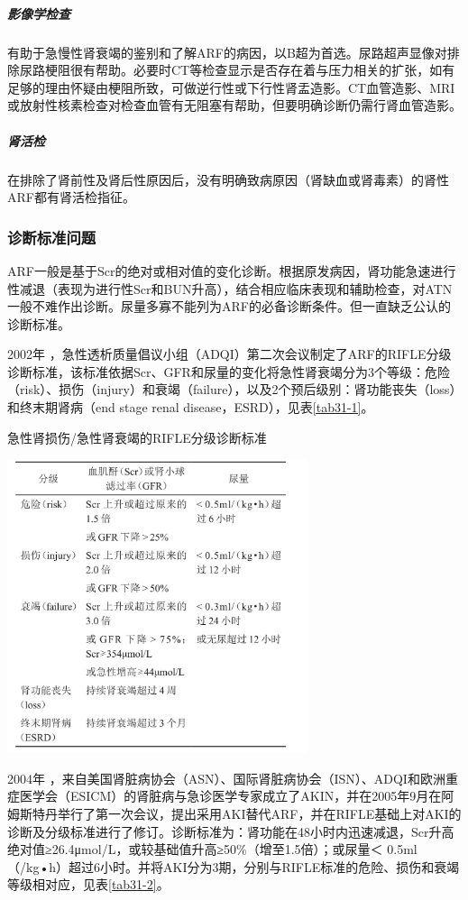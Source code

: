 \subparagraph{影像学检查}

有助于急慢性肾衰竭的鉴别和了解ARF的病因，以B超为首选。尿路超声显像对排除尿路梗阻很有帮助。必要时CT等检查显示是否存在着与压力相关的扩张，如有足够的理由怀疑由梗阻所致，可做逆行性或下行性肾盂造影。CT血管造影、MRI或放射性核素检查对检查血管有无阻塞有帮助，但要明确诊断仍需行肾血管造影。

\subparagraph{肾活检}

在排除了肾前性及肾后性原因后，没有明确致病原因（肾缺血或肾毒素）的肾性ARF都有肾活检指征。

\subsubsection{诊断标准问题}

ARF一般是基于Scr的绝对或相对值的变化诊断。根据原发病因，肾功能急速进行性减退（表现为进行性Scr和BUN升高），结合相应临床表现和辅助检查，对ATN一般不难作出诊断。尿量多寡不能列为ARF的必备诊断条件。但一直缺乏公认的诊断标准。

2002年
，急性透析质量倡议小组（ADQI）第二次会议制定了ARF的RIFLE分级诊断标准，该标准依据Scr、GFR和尿量的变化将急性肾衰竭分为3个等级：危险（risk）、损伤（injury）和衰竭（failure），以及2个预后级别：肾功能丧失（loss）和终末期肾病（end
stage renal disease，ESRD），见表\ref{tab31-1}。

\begin{table}[htbp]
\centering
\caption{急性肾损伤/急性肾衰竭的RIFLE分级诊断标准}
\label{tab31-1}
\includegraphics[width=3.47917in,height=3.39583in]{./images/Image00118.jpg}
\end{table}

2004年
，来自美国肾脏病协会（ASN）、国际肾脏病协会（ISN）、ADQI和欧洲重症医学会（ESICM）的肾脏病与急诊医学专家成立了AKIN，并在2005年9月在阿姆斯特丹举行了第一次会议，提出采用AKI替代ARF，并在RIFLE基础上对AKI的诊断及分级标准进行了修订。诊断标准为：肾功能在48小时内迅速减退，Scr升高绝对值≥26.4μmol/L，或较基础值升高≥50\%（增至1.5倍）；或尿量＜
0.5ml（/kg•h）超过6小时。并将AKI分为3期，分别与RIFLE标准的危险、损伤和衰竭等级相对应，见表\ref{tab31-2}。

